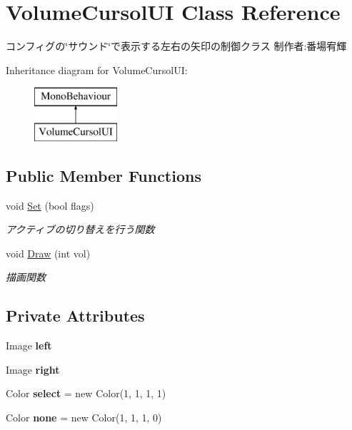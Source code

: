 \hypertarget{class_volume_cursol_u_i}{}\section{Volume\+Cursol\+UI Class Reference}
\label{class_volume_cursol_u_i}


コンフィグの\char`\"{}サウンド\char`\"{}で表示する左右の矢印の制御クラス 制作者\+:番場宥輝  


Inheritance diagram for Volume\+Cursol\+UI\+:\begin{figure}[H]
\begin{center}
\leavevmode
\includegraphics[height=2.000000cm]{class_volume_cursol_u_i}
\end{center}
\end{figure}
\subsection*{Public Member Functions}
\begin{DoxyCompactItemize}
\item 
void \hyperlink{class_volume_cursol_u_i_ae0b7838fedc7fb88b8d50eceb7608228}{Set} (bool flags)
\begin{DoxyCompactList}\small\item\em アクティブの切り替えを行う関数 \end{DoxyCompactList}\item 
void \hyperlink{class_volume_cursol_u_i_a3e00da6d503c7487983163c1d68eb368}{Draw} (int vol)
\begin{DoxyCompactList}\small\item\em 描画関数 \end{DoxyCompactList}\end{DoxyCompactItemize}
\subsection*{Private Attributes}
\begin{DoxyCompactItemize}
\item 
\mbox{\label{class_volume_cursol_u_i_a3873cbc3505fd28975bdb62d19ce555b}} 
Image {\bfseries left}
\item 
\mbox{\label{class_volume_cursol_u_i_a28e38a98ebcfde1ae5ea7d76ae10a83d}} 
Image {\bfseries right}
\item 
\mbox{\label{class_volume_cursol_u_i_a15ec8c1bd901e90db08582d4ee5cab98}} 
Color {\bfseries select} = new Color(1, 1, 1, 1)
\item 
\mbox{\label{class_volume_cursol_u_i_a22c9cb51e19ae8ef3b1baebfbd4bcc52}} 
Color {\bfseries none} = new Color(1, 1, 1, 0)
\end{DoxyCompactItemize}



